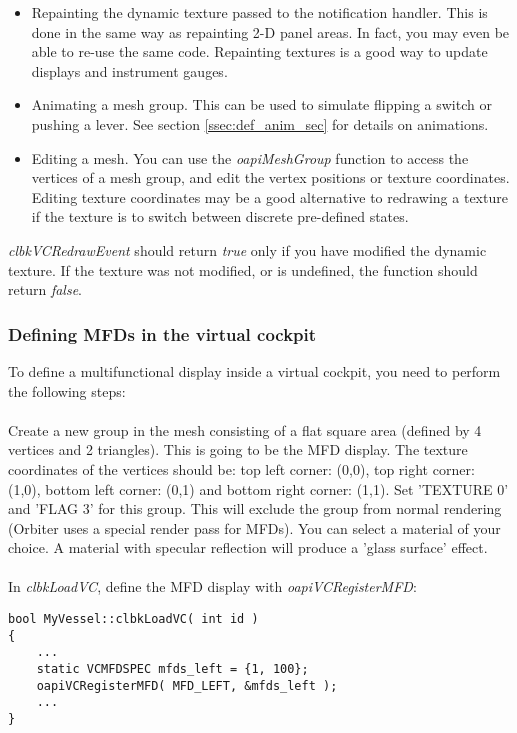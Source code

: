 \documentclass[Orbiter Developer Manual.tex]{subfiles}
\begin{document}
\begin{itemize}
\item Repainting the dynamic texture passed to the notification handler. This is done in the same way as repainting 2-D panel areas. In fact, you may even be able to re-use the same code. Repainting textures is a good way to update displays and instrument gauges.
\item Animating a mesh group. This can be used to simulate flipping a switch or pushing a lever. See section \ref{ssec:def_anim_sec} for details on animations.
\item Editing a mesh. You can use the \textit{oapiMeshGroup} function to access the vertices of a mesh group, and edit the vertex positions or texture coordinates. Editing texture coordinates may be a good alternative to redrawing a texture if the texture is to switch between discrete pre-defined states.
\end{itemize}

\noindent
\textit{clbkVCRedrawEvent} should return \textit{true} only if you have modified the dynamic texture. If the texture was not modified, or is undefined, the function should return \textit{false}.


\subsubsection{Defining MFDs in the virtual cockpit}
To define a multifunctional display inside a virtual cockpit, you need to perform the following steps:\\
\\
Create a new group in the mesh consisting of a flat square area (defined by 4 vertices and 2 triangles). This is going to be the MFD display. The texture coordinates of the vertices should be: top left corner: (0,0), top right corner: (1,0), bottom left corner: (0,1) and bottom right corner: (1,1). Set 'TEXTURE 0' and 'FLAG 3' for this group. This will exclude the group from normal rendering (Orbiter uses a special render pass for MFDs). You can select a material of your choice. A material with specular reflection will produce a 'glass surface' effect.\\
\\
In \textit{clbkLoadVC}, define the MFD display with \textit{oapiVCRegisterMFD}:

\begin{lstlisting}
bool MyVessel::clbkLoadVC( int id )
{
	...
	static VCMFDSPEC mfds_left = {1, 100};
	oapiVCRegisterMFD( MFD_LEFT, &mfds_left );
	...
}
\end{lstlisting}
\end{document}
